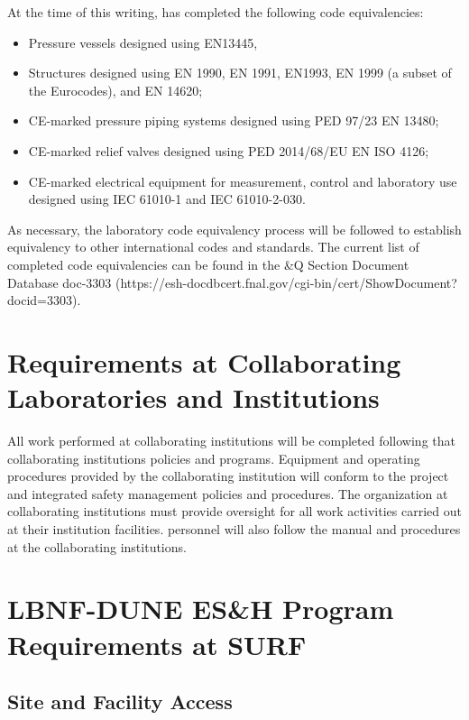 At the time of this writing, \fnal has completed the following code
equivalencies:
\begin{itemize}
 \item Pressure vessels designed using EN13445,
 \item Structures designed using EN 1990, EN 1991, EN1993, EN 1999 (a
   subset of the Eurocodes), and EN 14620;
 \item CE-marked pressure piping systems designed using PED 97/23 EN 13480;
 \item CE-marked relief valves designed using PED 2014/68/EU EN ISO 4126;
 \item CE-marked electrical equipment for measurement, control and
   laboratory use designed using IEC 61010-1 and IEC 61010-2-030.
\end{itemize}

As necessary, the laboratory code equivalency process will be followed
to establish equivalency to other international codes and
standards. The current list of completed code equivalencies can be
found in the \&Q Section Document Database doc-3303
(https://esh-docdbcert.fnal.gov/cgi-bin/cert/ShowDocument?docid=3303).


\section{ Requirements at Collaborating Laboratories and Institutions}

All work performed at collaborating institutions will be completed
following that collaborating institutions  policies and
programs. Equipment and operating procedures provided by the
collaborating institution will conform to the  project
 and integrated safety management policies and
procedures. The  organization at collaborating institutions
must provide  oversight for all work activities carried
out at their institution facilities. 
personnel will also follow the  manual and procedures at
the collaborating institutions.

\section{LBNF-DUNE ES\&H Program Requirements at SURF}

\subsection{Site and Facility Access}

